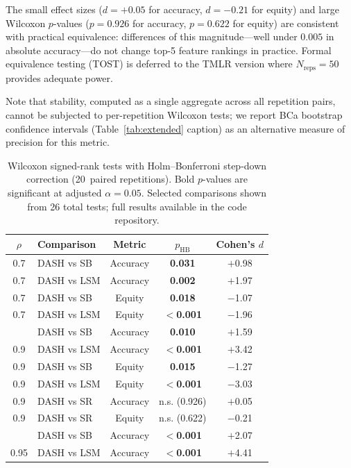 \documentclass[11pt]{article}
\newcommand{\rhovar}{\rho}
\begin{document}
The small effect sizes ($d = +0.05$ for accuracy, $d = -0.21$ for equity)
and large Wilcoxon $p$-values ($p = 0.926$ for accuracy, $p = 0.622$ for
equity) are consistent with practical equivalence: differences of this
magnitude---well under $0.005$ in absolute accuracy---do not change
top-5 feature rankings in practice.  Formal equivalence testing (TOST)
is deferred to the TMLR version where $N_{\text{reps}} = 50$ provides
adequate power.

Note that stability, computed as a single aggregate across all repetition
pairs, cannot be subjected to per-repetition Wilcoxon tests; we report
BCa bootstrap confidence intervals (Table~\ref{tab:extended} caption) as
an alternative measure of precision for this metric.

\begin{table}[htbp]
\centering
\caption{Wilcoxon signed-rank tests with Holm--Bonferroni step-down correction
(20~paired repetitions). Bold $p$-values are significant at adjusted
$\alpha = 0.05$. Selected comparisons shown from 26 total tests;
full results available in the code repository.}
\label{tab:significance}
\small
\begin{tabular}{clccc}
\toprule
$\rhovar$ & \textbf{Comparison} & \textbf{Metric} & $p_{\text{HB}}$ & Cohen's $d$ \\
\midrule
0.7  & DASH vs SB  & Accuracy & \textbf{0.031} & $+$0.98 \\
0.7  & DASH vs LSM & Accuracy & \textbf{0.002} & $+$1.97 \\
0.7  & DASH vs SB  & Equity   & \textbf{0.018} & $-$1.07 \\
0.7  & DASH vs LSM & Equity   & \textbf{$<$0.001} & $-$1.96 \\
\addlinespace
0.9  & DASH vs SB  & Accuracy & \textbf{0.010} & $+$1.59 \\
0.9  & DASH vs LSM & Accuracy & \textbf{$<$0.001} & $+$3.42 \\
0.9  & DASH vs SB  & Equity   & \textbf{0.015} & $-$1.27 \\
0.9  & DASH vs LSM & Equity   & \textbf{$<$0.001} & $-$3.03 \\
0.9  & DASH vs SR  & Accuracy & n.s. (0.926) & $+$0.05 \\
0.9  & DASH vs SR  & Equity   & n.s. (0.622) & $-$0.21 \\
\addlinespace
0.95 & DASH vs SB  & Accuracy & \textbf{$<$0.001} & $+$2.07 \\
0.95 & DASH vs LSM & Accuracy & \textbf{$<$0.001} & $+$4.41 \\
\bottomrule
\end{tabular}
\end{table}
\end{document}

